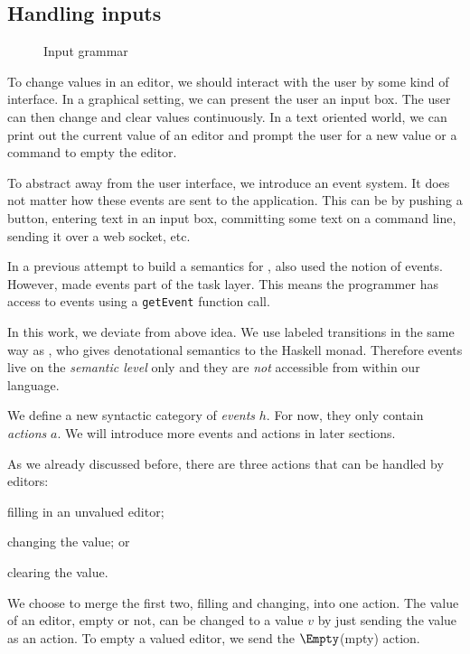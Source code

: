 \subsection{Handling inputs}
\label{sec:handling}

\begin{figure}
  \caption{Input grammar} \label{fig:input-grammar}
\end{figure}

To change values in an editor,
we should interact with the user by some kind of interface.
In a graphical setting,
we can present the user an input box.
The user can then change and clear values continuously.
In a text oriented world,
we can print out the current value of an editor
and prompt the user for a new value
or a command to empty the editor.

To abstract away from the user interface,
we introduce an event system.
It does not matter how these events are sent to the application.
This can be by pushing a button,
entering text in an input box,
committing some text on a command line,
sending it over a web socket,
etc.

In a previous attempt to build a semantics for \TOP,
\textcite{theses/radboud/VinterHviid18} also used the notion of events.
However, \citeauthor{theses/radboud/VinterHviid18} made events part of the task layer.
This means the programmer has access to events using a \texttt{getEvent} function call.

In this work,
we deviate from above idea.
We use labeled transitions in the same way as \textcite{school/maktoberdorf/PeytonJones01},
who gives denotational semantics to the Haskell \IO monad.
Therefore events live on the \emph{semantic level} only
and they are \emph{not} accessible from within our language.

We define a new syntactic category of \emph{events} $h$.
For now, they only contain \emph{actions} $a$.
We will introduce more events and actions in later sections.

As we already discussed before,
there are three actions that can be handled by editors:
\begin{enumerate*}
  \item filling in an unvalued editor;
  \item changing the value; or
  \item clearing the value.
\end{enumerate*}
We choose to merge the first two, filling and changing, into one action.
The value of an editor, empty or not, can be changed to a value $v$ by just sending the value as an action.
To empty a valued editor, we send the $\Empty$(mpty) action.

